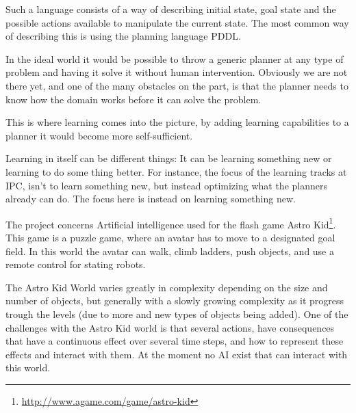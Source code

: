 	Such a language consists of a way of describing initial state, goal state and the possible actions available to manipulate the current state. The most common way of describing this is using the planning language PDDL. 
	

%


	
	In the ideal world it would be possible to throw a generic planner at any type of problem and having it solve it without human intervention. 
	Obviously we are not there yet, and one of the many obstacles on the part, is that the planner needs to know how the domain works before it can solve the problem. 

	This is where learning comes into the picture, by adding learning capabilities to a planner it would become more self-sufficient. 

	Learning in itself can be different things: It can be learning something new or learning to do some thing better. For instance, the focus of the learning tracks at IPC, isn't to learn something new, but instead optimizing what the planners already can do. The focus here is instead on learning something new. %



	The project concerns Artificial intelligence used for the flash game Astro Kid\footnote{\url{http://www.agame.com/game/astro-kid}}. This game is a puzzle game, where an avatar has to move to a designated goal field. In this world the avatar can walk, climb ladders, push objects, and use a remote control for stating robots.
	
	The Astro Kid World varies greatly in complexity depending on the size and number of objects, but generally with a slowly growing complexity as it progress trough the levels (due to more and new types of objects being added). One of the challenges with the Astro Kid world is that several actions, have consequences that have a continuous effect over several time steps, and how to represent these effects and interact with them. At the moment no AI exist that can interact with this world. 

